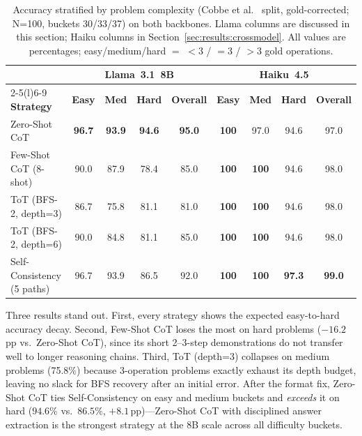 \documentclass[conference]{IEEEtran}
\begin{document}
\begin{table}[t]
\centering
\caption{Accuracy stratified by problem complexity
(Cobbe et al.~\cite{cobbe2021gsm8k} split, gold-corrected; N=100,
buckets 30/33/37) on both backbones. Llama columns are discussed in
this section; Haiku columns in Section~\ref{sec:results:crossmodel}.
All values are percentages; easy/medium/hard $=$ $<$3 / $=$3 / $>$3
gold operations.}
\label{tab:strat}
\setlength{\tabcolsep}{5pt}
\small
\begin{tabular}{@{}lcccc@{\hspace{1.6em}}cccc@{}}
\toprule
& \multicolumn{4}{c}{\textbf{Llama~3.1~8B}} &
  \multicolumn{4}{c}{\textbf{Haiku~4.5}} \\
\cmidrule(lr){2-5}\cmidrule(l){6-9}
\textbf{Strategy} & \textbf{Easy} & \textbf{Med} & \textbf{Hard} & \textbf{Overall}
& \textbf{Easy} & \textbf{Med} & \textbf{Hard} & \textbf{Overall} \\
\midrule
Zero-Shot CoT              & \textbf{96.7} & \textbf{93.9} & \textbf{94.6} & \textbf{95.0} & \textbf{100} & 97.0 & 94.6 & 97.0 \\
Few-Shot CoT (8-shot)      & 90.0 & 87.9 & 78.4 & 85.0 & \textbf{100} & \textbf{100} & 94.6 & 98.0 \\
ToT (BFS-2, depth=3)       & 86.7 & 75.8 & 81.1 & 81.0 & \textbf{100} & \textbf{100} & 94.6 & 98.0 \\
ToT (BFS-2, depth=6)       & 90.0 & 84.8 & 81.1 & 85.0 & \textbf{100} & \textbf{100} & 94.6 & 98.0 \\
Self-Consistency (5 paths) & 96.7 & 93.9 & 86.5 & 92.0 & \textbf{100} & \textbf{100} & \textbf{97.3} & \textbf{99.0} \\
\bottomrule
\end{tabular}
\end{table}

Three results stand out.
First, every strategy shows the expected easy-to-hard accuracy decay.
Second, Few-Shot CoT loses the most on hard problems ($-16.2$\,pp vs.\
Zero-Shot CoT), since its short 2--3-step demonstrations do not
transfer well to longer reasoning chains.
Third, ToT (depth=3) collapses on medium problems (75.8\%) because
3-operation problems exactly exhaust its depth budget, leaving no slack
for BFS recovery after an initial error.
After the format fix, Zero-Shot CoT ties Self-Consistency on easy and
medium buckets and \emph{exceeds} it on hard ($94.6\%$ vs.\ $86.5\%$,
$+8.1$\,pp)---Zero-Shot CoT with disciplined answer extraction is the
strongest strategy at the 8B scale across all difficulty buckets.
\end{document}
